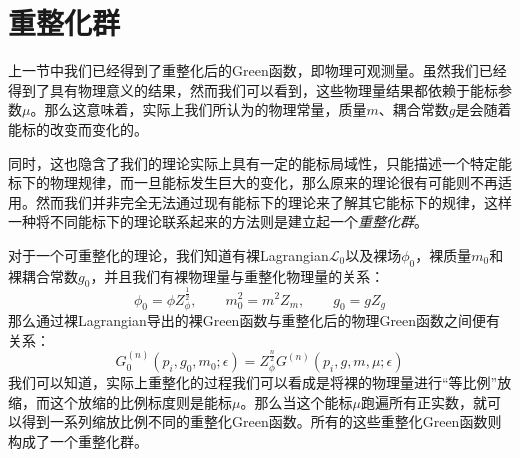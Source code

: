 \section{重整化群}
上一节中我们已经得到了重整化后的Green函数，即物理可观测量。虽然我们已经得到了具有物理意义的结果，然而我们可以看到，这些物理量结果都依赖于能标参数$\mu$。那么这意味着，实际上我们所认为的物理常量，质量$m$、耦合常数$g$是会随着能标的改变而变化的。

同时，这也隐含了我们的理论实际上具有一定的能标局域性，只能描述一个特定能标下的物理规律，而一旦能标发生巨大的变化，那么原来的理论很有可能则不再适用。然而我们并非完全无法通过现有能标下的理论来了解其它能标下的规律，这样一种将不同能标下的理论联系起来的方法则是建立起一个\emph{重整化群}。

对于一个可重整化的理论，我们知道有裸Lagrangian$\mathcal{L}_0$以及裸场$\phi_0$，裸质量$m_0$和裸耦合常数$g_0$，并且我们有裸物理量与重整化物理量的关系：
\begin{equation}
\phi_0=\phi Z^{\frac{1}{2}}_\phi,\qquad m^2_0=m^2 Z_m,\qquad g_0=g Z_g
\end{equation}
那么通过裸Lagrangian导出的裸Green函数与重整化后的物理Green函数之间便有关系：
\begin{equation}
G^{(n)}_0(p_i,g_0,m_0;\epsilon)=Z_\phi^{\frac{n}{2}}G^{(n)}(p_i,g,m,\mu;\epsilon)
\end{equation}
我们可以知道，实际上重整化的过程我们可以看成是将裸的物理量进行“等比例”放缩，而这个放缩的比例标度则是能标$\mu$。那么当这个能标$\mu$跑遍所有正实数，就可以得到一系列缩放比例不同的重整化Green函数。所有的这些重整化Green函数则构成了一个重整化群。

